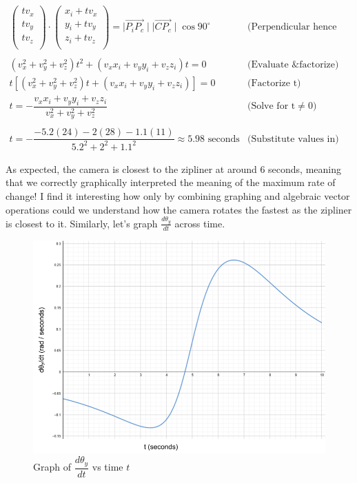 \documentclass[12pt]{article}
\begin{document}
$$
\begin{array}{c|c}
    \begin{pmatrix} tv_x \\ tv_y \\ tv_z \\ \end{pmatrix} \cdot \begin{pmatrix} x_i+tv_x \\ y_i +tv_y \\ z_i+tv_z \\ \end{pmatrix} = \mid \overrightarrow{P_iP_c} \mid \mid \overrightarrow{CP_c} \mid \cos 90^{\circ} & \text{(Perpendicular hence scalar product 0)}\\ \\
    (v_x^2+v_y^2+v_z^2)t^2 + (v_xx_i+v_yy_i+v_zz_i)t = 0 & \text{(Evaluate \& factorize)}\\ 
    t\left[(v_x^2+v_y^2+v_z^2)t + (v_xx_i+v_yy_i+v_zz_i)\right] = 0 & \text{(Factorize t)}\\ 
    t = -\dfrac{v_xx_i+v_yy_i+v_zz_i}{v_x^2+v_y^2+v_z^2}& \text{(Solve for t} \neq 0 \text{)}\\ \\
    t = -\dfrac{-5.2(24) - 2(28) - 1.1(11)}{5.2^2+2^2+1.1^2} \approx 5.98 \text{ seconds}& \text{(Substitute values in)}
\end{array} 
$$

As expected, the camera is closest to the zipliner at around 6 seconds, meaning that we correctly graphically interpreted the meaning of the maximum rate of change! I find it interesting how only by combining graphing and algebraic vector operations could we understand how the camera rotates the fastest as the zipliner is closest to it. Similarly, let's graph $\frac{d\theta_y}{dt}$ across time. 

\begin{figure}[H]
\centering
\includegraphics[width=400pt]{img/graph2.png}
\caption{\label{fig:5}Graph of $\dfrac{d\theta_y}{dt}$ vs time $t$}
\end{figure}
\end{document}
